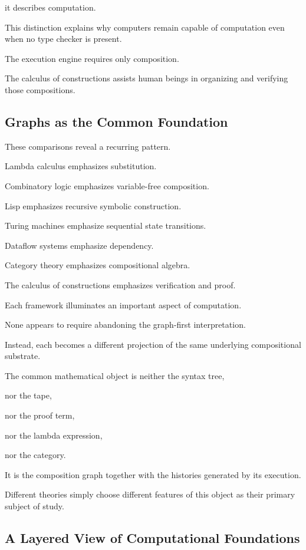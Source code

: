 \documentclass[12pt,oneside]{article}
\begin{document}
it describes computation.

This distinction explains why computers remain capable of computation even when no type checker is present.

The execution engine requires only composition.

The calculus of constructions assists human beings in organizing and verifying those compositions.

\subsection{Graphs as the Common Foundation}

These comparisons reveal a recurring pattern.

Lambda calculus emphasizes substitution.

Combinatory logic emphasizes variable-free composition.

Lisp emphasizes recursive symbolic construction.

Turing machines emphasize sequential state transitions.

Dataflow systems emphasize dependency.

Category theory emphasizes compositional algebra.

The calculus of constructions emphasizes verification and proof.

Each framework illuminates an important aspect of computation.

None appears to require abandoning the graph-first interpretation.

Instead, each becomes a different projection of the same underlying compositional substrate.

The common mathematical object is neither the syntax tree,

nor the tape,

nor the proof term,

nor the lambda expression,

nor the category.

It is the composition graph together with the histories generated by its execution.

Different theories simply choose different features of this object as their primary subject of study.

\subsection{A Layered View of Computational Foundations}
\end{document}
